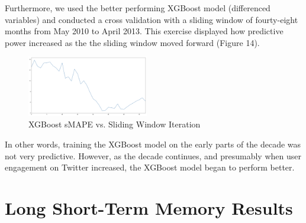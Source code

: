 \documentclass[12pt,oneside]{chicagocapstone}
\begin{document}
Furthermore, we used the better performing XGBoost model (differenced variables) and conducted a cross validation with a sliding window of fourty-eight months from May 2010 to April 2013. This exercise displayed how predictive power increased as the the sliding window moved forward (Figure 14).
\begin{figure}

{\centering \includegraphics[width=200px,angle = 0, scale=2.1]{figure/slidingwindow} 

}

\caption{XGBoost sMAPE vs. Sliding Window Iteration}\label{fig:slidingwindow}
\end{figure}
In other words, training the XGBoost model on the early parts of the decade was not very predictive. However, as the decade continues, and presumably when user engagement on Twitter increased, the XGBoost model began to perform better.

\hypertarget{long-short-term-memory-results}{%
\section*{Long Short-Term Memory Results}\label{long-short-term-memory-results}}
\end{document}
